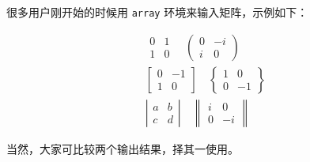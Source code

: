 很多用户刚开始的时候用 \verb|array| 环境来输入矩阵，示例如下：
\begin{example}
\begin{gather*}
 \begin{array}{cc}  0 &  1 \\ 1 &  0 \end{array}  \quad
 \left(\begin{array}{cc}  0 & -i \\ i &  0 \end{array}\right) \\
 \left[\begin{array}{cc} 0 & -1 \\ 1 &  0 \end{array}\right] \quad
 \left\{\begin{array}{cc} 1 &  0 \\ 0 & -1 \end{array}\right\} \\
 \left|\begin{array}{cc} a &  b \\ c &  d \end{array}\right| \quad
 \left\|\begin{array}{cc} i &  0 \\ 0 & -i \end{array}\right\|
\end{gather*}
\end{example}

当然，大家可比较两个输出结果，择其一使用。

